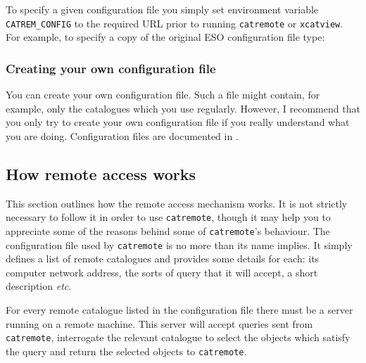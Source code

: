 \documentclass[twoside,11pt]{starlink}
\begin{document}

To specify a given configuration file you simply set environment
variable \texttt{CATREM\_CONFIG} to the required URL prior to running \texttt{catremote} or \texttt{xcatview}.  For example, to specify a copy of the
original ESO configuration file type:

\begin{terminalv}
\end{terminalv}

\subsubsection{Creating your own configuration file}

You can create your own configuration file.  Such a file might contain,
for example, only the catalogues which you use regularly.  However, I
recommend that you only try to create your own configuration file if you
really understand what you are doing.  Configuration files are documented
in \cite{SSN75}.

\subsection{How remote access works  \label{REMWORK} }

This section outlines how the remote access mechanism works.  It is
not strictly necessary to follow it in order to use \texttt{catremote},
though it may help you to appreciate some of the reasons behind some
of \texttt{catremote}'s behaviour.  The configuration file used by \texttt{catremote} is no more than its name implies.  It simply defines a list of
remote catalogues and provides some details for each: its computer network
address, the sorts of query that it will accept, a short description
\emph{etc}.

For every remote catalogue listed in the configuration file there must
be a server running on a remote machine.  This server will accept
queries sent from \texttt{catremote}, interrogate the relevant catalogue
to select the objects which satisfy the query and return the selected
objects to \texttt{catremote}.
\end{document}
